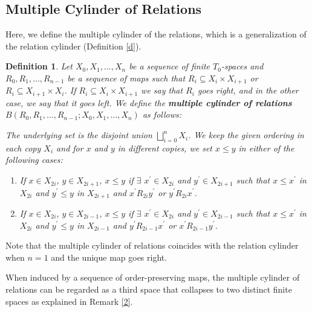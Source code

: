 \documentclass[12pt,a4paper,twoside, reqno, tbtags]{article}
\numberwithin{equation}{section}
\newtheorem{definition}{Definition}[section]
\begin{document}
\subsection{Multiple Cylinder of Relations}

    Here, we define the multiple cylinder of the relations, which is a generalization of the relation cylinder (Definition \ref{d}).
\begin{definition}\label{1}
    Let $X_0,X_1,\dots,X_n$ be a sequence of finite $T_0$-spaces and $R_0, R_1,\dots ,R_{n-1}$ be a sequence of maps such that $R_i \subseteq X_i \times X_{i+1}$ or
    $R_i \subseteq X_{i+1} \times X_{i}$. If $R_i \subseteq X_i \times X_{i+1}$ we say that $R_i$ goes right, and in the other case, we say that it goes left. We define the \textbf {multiple cylinder of relations} $B(R_0, R_1,\dots , R_{n-1}; X_0,X_1,\dots,X_n)$ as follows:
    
    \noindent The underlying set is the disjoint union $\bigsqcup\limits_{i=0}^{n} X_i$. We keep the given ordering in each copy $X_i$ and for $x$ and $y$ in different copies, we set $x \leq y$ in either of the following cases:
\begin{enumerate}
    \renewcommand{\labelenumi}{\normalfont\arabic{enumi}.} %
    \item  If $x \in X_{2i}$, $y \in X_{2i+1}$, $x\leq y$ if $\exists$ $x^{\prime}\in X_{2i}$ and $y^{\prime}\in X_{2i+1}$ such that $x\leq x^{\prime}$ in $X_{2i}$ and $y^{\prime}\leq y$ in $X_{2i+1}$ and $x^{\prime} R_{2i} y^{\prime}$ or $y^{\prime} R_{2i} x^{\prime}$.
    \item  If $x \in X_{2i}$, $y \in X_{2i-1}$, $x\leq y$ if $\exists$ $x^{\prime}\in X_{2i}$ and $y^{\prime}\in X_{2i-1}$ such that $x\leq x^{\prime}$ in $X_{2i}$ and $y^{\prime}\leq y$ in $X_{2i-1}$ and $y^{\prime} R_{2i-1} x^{\prime}$ or $x^{\prime} R_{2i-1} y^{\prime}$.
\end{enumerate}
\end{definition}
    \noindent Note that the multiple cylinder of relations coincides with the relation cylinder when $n=1$ and the unique map goes right.
    
    \noindent When induced by a sequence of order-preserving maps, the multiple cylinder of relations can be regarded as a third space that collapses to two distinct finite spaces as explained in Remark \ref{2}.
    
\end{document}
